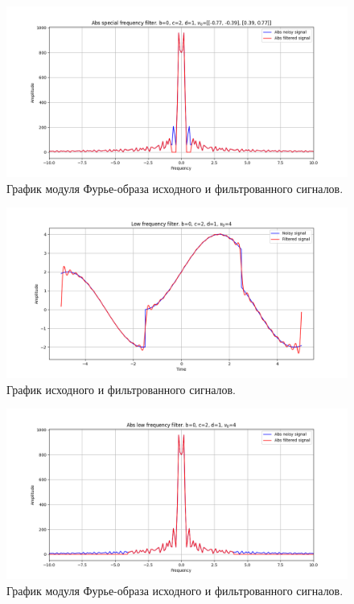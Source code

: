 \documentclass[a4paper, 12pt]{article}
\begin{document}
    \begin{figure}[!htb]
        \centering
        \includegraphics[scale=0.485]{2_abs_u_U_nospec.png}
        \captionsetup{skip=0pt}
        \caption{График модуля Фурье-образа исходного и фильтрованного сигналов.}
        \label{fig:fig78}
    \end{figure}
    \begin{figure}[!htb]
        \centering
        \includegraphics[scale=0.485]{2_1_u_flt_u_nospec.png}
        \captionsetup{skip=0pt}
        \caption{График исходного и фильтрованного сигналов.}
        \label{fig:fig79}
    \end{figure}
    \begin{figure}[!htb]
        \centering
        \includegraphics[scale=0.485]{2_1_abs_u_U_nospec.png}
        \captionsetup{skip=0pt}
        \caption{График модуля Фурье-образа исходного и фильтрованного сигналов.}
        \label{fig:fig80}
    \end{figure}
\end{document}
